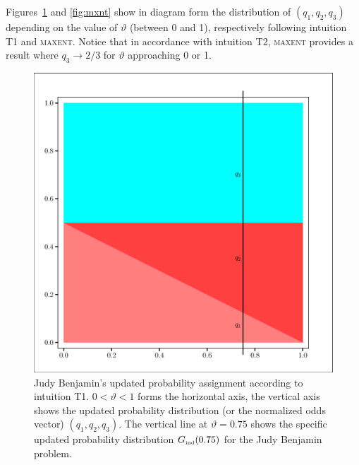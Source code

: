 \documentclass[smallextended]{svjour3}       %
\newcommand{\lwv}[0]{0.6}
\newcommand{\qvu}[0]{\vartheta}
\begin{document}

Figures~\ref{fig:unif} and \ref{fig:mxnt} show in diagram form the
distribution of $(q_{1},q_{2},q_{3})$ depending on the value of ${\qvu}$
(between 0 and 1), respectively following intuition T1 and
\textsc{maxent}. Notice that in accordance with intuition T2,
\textsc{maxent} provides a result where $q_{3}\rightarrow{}2/3$ for
${\qvu}$ approaching 0 or 1.

\begin{figure}[h!]
  \begin{flushright}
    \begin{minipage}[h]{\lwv\linewidth}
      \includegraphics[width=\textwidth]{zeroone-unif.eps}
      \caption{Judy Benjamin's updated probability assignment
        according to intuition T1. $0<{\qvu}<1$ forms the horizontal axis,
        the vertical axis shows the updated probability distribution
        (or the normalized odds vector) $(q_{1},q_{2},q_{3})$. The
        vertical line at ${\qvu}=0.75$ shows the specific updated
        probability distribution $G_{\mbox{\tiny ind}}(0.75)$ for the Judy
        Benjamin problem.}
      \label{fig:unif}
    \end{minipage}
  \end{flushright}
\end{figure}
\end{document}
